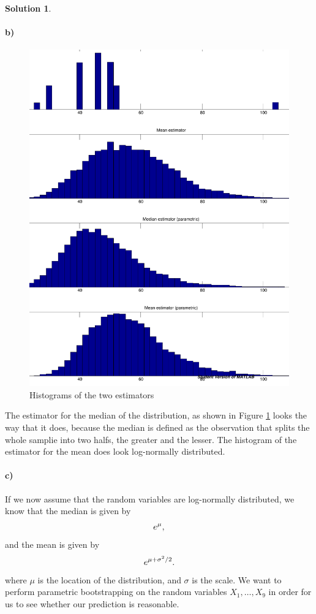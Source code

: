 \documentclass[a4paper, fleqn]{amsart}
\theoremstyle{definition}
\newtheorem{sltn}{Solution}
\begin{document}
\begin{sltn}
\paragraph{b)}
\begin{figure}[p]
  \centering
  \includegraphics[scale=0.3]{estimators_histogram}
  \caption{Histograms of the two estimators}
  \label{fig:estimator_histogram}
\end{figure}
The estimator for the median of the distribution, as shown in Figure
\ref{fig:estimator_histogram} looks the way that it does, because the median is
defined as the observation that splits the whole samplie into two halfs, the
greater and the lesser. The histogram of the estimator for the mean does look
log-normally distributed.

\paragraph{c)} If we now assume that the random variables are log-normally distributed, we know
that the median is given by
\begin{equation}
  \notag
  e^\mu, 
\end{equation}
and the mean is given by
\begin{equation}
  \notag
  e^{\mu + \sigma^2 / 2}.
\end{equation} where
$\mu$ is the location of the distribution, and $\sigma$ is the scale. We want
to perform parametric bootstrapping on the random variables $X_1, \dots, X_9$
in order for us to see whether our prediction is reasonable.


\end{sltn}
\end{document}
